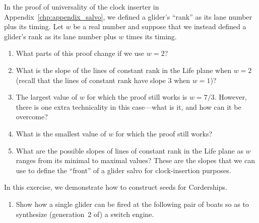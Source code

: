 \begin{multicols}{2}
	
	\mfilbreak
	
	
	\begin{problemstar}\label{exer:slow_salvo_clock_slope} 
		In the proof of universality of the clock inserter in Appendix~\ref{chp:appendix_salvo}, we defined a glider's ``rank'' as its lane number plus its timing. Let $w$ be a real number and suppose that we instead defined a glider's rank as its lane number plus $w$ times its timing.
		\begin{enumerate}[label=\bf\color{ocre}(\alph*)]
			\item What parts of this proof change if we use $w = 2$?
			
			\item What is the slope of the lines of constant rank in the Life plane when $w = 2$ (recall that the lines of constant rank have slope $3$ when $w = 1$)?
			
			\item The largest value of $w$ for which the proof still works is $w = 7/3$. However, there is one extra technicality in this case---what is it, and how can it be overcome?
			
			\item What is the smallest value of $w$ for which the proof still works?
			
			
			\item What are the possible slopes of lines of constant rank in the Life plane as $w$ ranges from its minimal to maximal values? These are the slopes that we can use to define the ``front'' of a glider salvo for clock-insertion purposes.
		\end{enumerate}
	\end{problemstar}
	
	
	\mfilbreak
	
	
	\begin{problemstar}\label{exer:2_engine_corder_seed}
		In this exercise, we demonstrate how to construct seeds for Corderships.\smallskip
		
		\begin{enumerate}[label=\bf\color{ocre}(\alph*)]
			\item {} Show how a single glider can be fired at the following pair of boats so as to synthesize (generation~$2$ of) a switch engine.
			\begin{center}
			\end{center}
			

\end{enumerate}
\end{problemstar}
\end{multicols}
